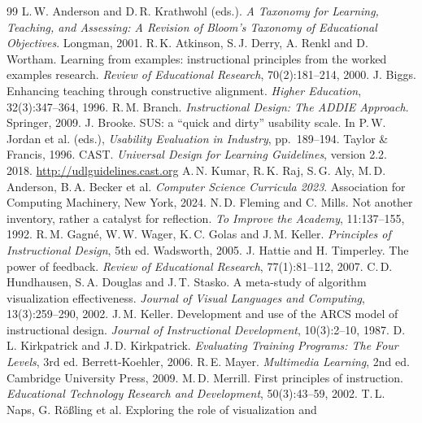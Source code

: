 \documentclass[11pt,a4paper]{article}
\begin{document}
\begin{thebibliography}{99}
 L.\,W. Anderson and D.\,R. Krathwohl (eds.). \emph{A Taxonomy for Learning,
  Teaching, and Assessing: A Revision of Bloom's Taxonomy of Educational Objectives}. Longman, 2001.
 R.\,K. Atkinson, S.\,J. Derry, A. Renkl and D. Wortham. Learning from examples:
  instructional principles from the worked examples research. \emph{Review of Educational Research},
  70(2):181--214, 2000.
 J. Biggs. Enhancing teaching through constructive alignment. \emph{Higher
  Education}, 32(3):347--364, 1996.
 R.\,M. Branch. \emph{Instructional Design: The ADDIE Approach}. Springer, 2009.
 J. Brooke. SUS: a ``quick and dirty'' usability scale. In P.\,W. Jordan et al.
  (eds.), \emph{Usability Evaluation in Industry}, pp.\ 189--194. Taylor \& Francis, 1996.
 CAST. \emph{Universal Design for Learning Guidelines}, version 2.2. 2018.
  \url{http://udlguidelines.cast.org}
 A.\,N. Kumar, R.\,K. Raj, S.\,G. Aly, M.\,D. Anderson, B.\,A. Becker et al.
  \emph{Computer Science Curricula 2023}. Association for Computing Machinery, New York, 2024.
 N.\,D. Fleming and C. Mills. Not another inventory, rather a catalyst for
  reflection. \emph{To Improve the Academy}, 11:137--155, 1992.
 R.\,M. Gagn\'e, W.\,W. Wager, K.\,C. Golas and J.\,M. Keller.
  \emph{Principles of Instructional Design}, 5th ed. Wadsworth, 2005.
 J. Hattie and H. Timperley. The power of feedback. \emph{Review of Educational
  Research}, 77(1):81--112, 2007.
 C.\,D. Hundhausen, S.\,A. Douglas and J.\,T. Stasko. A meta-study of
  algorithm visualization effectiveness. \emph{Journal of Visual Languages and Computing},
  13(3):259--290, 2002.
 J.\,M. Keller. Development and use of the ARCS model of instructional design.
  \emph{Journal of Instructional Development}, 10(3):2--10, 1987.
 D.\,L. Kirkpatrick and J.\,D. Kirkpatrick. \emph{Evaluating Training
  Programs: The Four Levels}, 3rd ed. Berrett-Koehler, 2006.
 R.\,E. Mayer. \emph{Multimedia Learning}, 2nd ed. Cambridge University Press, 2009.
 M.\,D. Merrill. First principles of instruction. \emph{Educational Technology
  Research and Development}, 50(3):43--59, 2002.
 T.\,L. Naps, G. R\"o{\ss}ling et al. Exploring the role of visualization and

\end{thebibliography}
\end{document}

